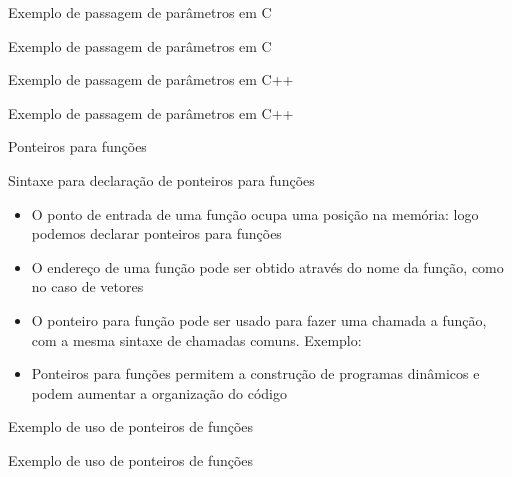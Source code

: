 \begin{frame}[fragile]{Exemplo de passagem de parâmetros em C}
\end{frame}

\begin{frame}[fragile]{Exemplo de passagem de parâmetros em C}
\end{frame}

\begin{frame}[fragile]{Exemplo de passagem de parâmetros em C++}
\end{frame}

\begin{frame}[fragile]{Exemplo de passagem de parâmetros em C++}
\end{frame}

\begin{frame}[fragile]{Ponteiros para funções}

    \begin{block}{Sintaxe para declaração de ponteiros para funções}
    \end{block}

	\begin{itemize}
		\item O ponto de entrada de uma função ocupa uma posição na memória: logo podemos declarar 
        ponteiros para funções

		\item O endereço de uma função pode ser obtido através do nome da função, como no caso de 
		vetores

		\item O ponteiro para função pode ser usado para fazer uma chamada a função, com a mesma 
        sintaxe de chamadas comuns. Exemplo:
		\item Ponteiros para funções permitem a construção de programas dinâmicos e podem aumentar 
        a organização do código
	\end{itemize}

\end{frame}

\begin{frame}[fragile]{Exemplo de uso de ponteiros de funções}
\end{frame}

\begin{frame}[fragile]{Exemplo de uso de ponteiros de funções}
\end{frame}

